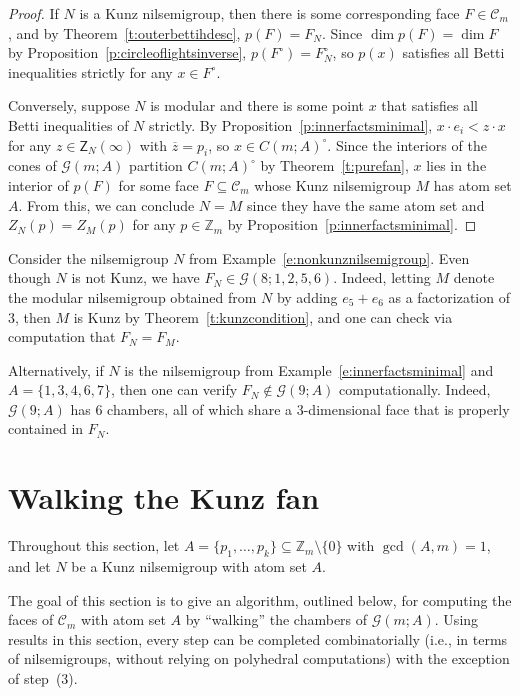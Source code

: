 \documentclass[ALCO, Unicode]{cedram}
\newcommand\ZZ{\mathbb{Z}}
\newcommand\cC{{\mathcal C}}
\begin{document}
\begin{proof}
If $N$ is a Kunz nilsemigroup, then there is some corresponding face $F \in \cC_m$, and by Theorem~\ref{t:outerbettihdesc}, $p(F) = F_N$.  
Since $\dim p(F) = \dim F$ by Proposition~\ref{p:circleoflightsinverse}, $p(F^\circ) = F_N^\circ$, so $p(x)$ satisfies all Betti inequalities strictly for any $x \in F^\circ$. 

Conversely, suppose $N$ is modular and there is some point $x$ that satisfies all Betti inequalities of $N$ strictly. By Proposition~\ref{p:innerfactsminimal}, $x \cdot e_i < z \cdot x$ for any $z \in \mathsf Z_N(\infty)$ with $\overline z = p_i$, so $x \in C(m;A)^\circ$.  Since the interiors of the cones of $\mathcal G(m;A)$ partition $C(m;A)^{\circ}$ by Theorem~\ref{t:purefan}, $x$ lies in the interior of $p(F)$ for some face $F \subseteq \cC_m$ whose Kunz nilsemigroup $M$ has atom set $A$. From this, we can conclude $N = M$ since they have the same atom set and $Z_N(p) = Z_M(p)$ for any $p \in \ZZ_m$ by Proposition~\ref{p:innerfactsminimal}.  
\end{proof}

\begin{exam}\label{e:kunzcondition}
Consider the nilsemigroup $N$ from Example~\ref{e:nonkunznilsemigroup}.  Even though $N$ is not Kunz, we have $F_N \in \mathcal G(8; 1,2,5,6)$.  Indeed, letting $M$ denote the modular nilsemigroup obtained from $N$ by adding $e_5 + e_6$ as a factorization of $3$, then $M$ is Kunz by Theorem~\ref{t:kunzcondition}, and one can check via computation that $F_N = F_M$.  

Alternatively, if $N$ is the nilsemigroup from Example~\ref{e:innerfactsminimal} and $A = \{1,3,4,6,7\}$, then one can verify $F_N \notin \mathcal G(9;A)$ computationally.  Indeed, $\mathcal G(9;A)$ has 6 chambers, all of which share a 3-dimensional face that is properly contained in $F_N$.  
\end{exam}



\section{Walking the Kunz fan}
\label{sec:kunzwalk}

Throughout this section, let $A = \{p_1,\ldots,p_k\} \subseteq \ZZ_m \setminus \{0\}$ with $\gcd(A,m) = 1$, and let $N$ be a Kunz nilsemigroup with atom set $A$.  

The goal of this section is to give an algorithm, outlined below, for computing the faces of $\cC_m$ with atom set $A$ by ``walking'' the chambers of $\mathcal G(m; A)$.  Using results in this section, every step can be completed combinatorially (i.e., in terms of nilsemigroups, without relying on polyhedral computations) with the exception of step~(3).  
\end{document}
